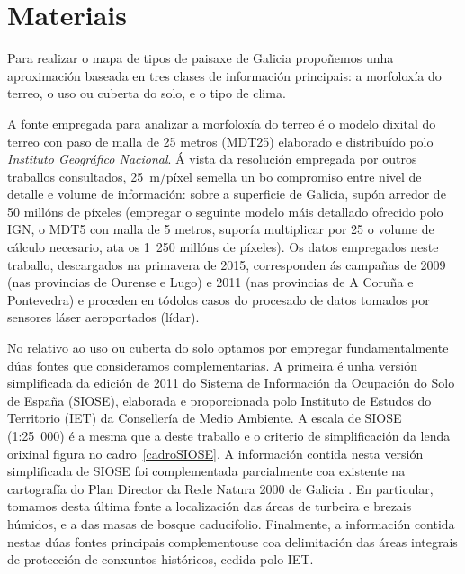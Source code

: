 \documentclass[11pt,a4paper]{article}
\begin{document}
\section{Materiais}


Para realizar o mapa de tipos de paisaxe de Galicia propoñemos unha aproximación baseada en tres clases de información principais: a morfoloxía do terreo, o uso ou cuberta do solo, e o tipo de clima.


A fonte empregada para analizar a morfoloxía do terreo é o modelo dixital do terreo con paso de malla de 25 metros (MDT25) elaborado e distribuído polo \emph{Instituto Geográfico Nacional}. Á vista da resolución empregada por outros traballos consultados, 25~m/píxel semella un bo compromiso entre nivel de detalle e volume de información: sobre a superficie de Galicia, supón arredor de 50 millóns de píxeles (empregar o seguinte modelo máis detallado ofrecido polo IGN, o MDT5 con malla de 5 metros, suporía multiplicar por 25 o volume de cálculo necesario, ata os 1~250 millóns de píxeles). Os datos empregados neste traballo, descargados na primavera de 2015, corresponden ás campañas de 2009 (nas provincias de Ourense e Lugo) e 2011 (nas provincias de A Coruña e Pontevedra) e proceden en tódolos casos do procesado de datos tomados por sensores láser aeroportados (lídar).


No relativo ao uso ou cuberta do solo optamos por empregar fundamentalmente dúas fontes que consideramos complementarias. A primeira é unha versión simplificada da edición de 2011 do Sistema de Información da Ocupación do Solo de España (SIOSE), elaborada e proporcionada polo Instituto de Estudos do Territorio (IET) da Consellería de Medio Ambiente. A escala de SIOSE (1:25~000) é a mesma que a deste traballo e o criterio de simplificación da lenda orixinal figura no cadro~\ref{cadroSIOSE}. A información contida nesta versión simplificada de SIOSE foi complementada parcialmente coa existente na cartografía do Plan Director da Rede Natura 2000 de Galicia \citep{PDRN2011}. En particular, tomamos desta última fonte a localización das áreas de turbeira e brezais húmidos, e a das masas de bosque caducifolio. Finalmente, a información contida nestas dúas fontes principais complementouse coa delimitación das áreas integrais de protección de conxuntos históricos, cedida polo IET.
\end{document}
